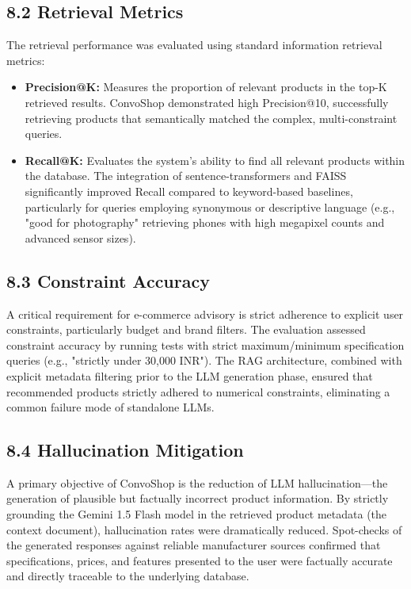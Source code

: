 \subsection*{8.2 Retrieval Metrics}
The retrieval performance was evaluated using standard information retrieval metrics:
\begin{itemize}
    \item \textbf{Precision@K:} Measures the proportion of relevant products in the top-K retrieved results. ConvoShop demonstrated high Precision@10, successfully retrieving products that semantically matched the complex, multi-constraint queries.
    \item \textbf{Recall@K:} Evaluates the system's ability to find all relevant products within the database. The integration of sentence-transformers and FAISS significantly improved Recall compared to keyword-based baselines, particularly for queries employing synonymous or descriptive language (e.g., "good for photography" retrieving phones with high megapixel counts and advanced sensor sizes).
\end{itemize}

\subsection*{8.3 Constraint Accuracy}
A critical requirement for e-commerce advisory is strict adherence to explicit user constraints, particularly budget and brand filters. The evaluation assessed constraint accuracy by running tests with strict maximum/minimum specification queries (e.g., "strictly under 30,000 INR"). The RAG architecture, combined with explicit metadata filtering prior to the LLM generation phase, ensured that recommended products strictly adhered to numerical constraints, eliminating a common failure mode of standalone LLMs.

\subsection*{8.4 Hallucination Mitigation}
A primary objective of ConvoShop is the reduction of LLM hallucination—the generation of plausible but factually incorrect product information. By strictly grounding the Gemini 1.5 Flash model in the retrieved product metadata (the context document), hallucination rates were dramatically reduced. Spot-checks of the generated responses against reliable manufacturer sources confirmed that specifications, prices, and features presented to the user were factually accurate and directly traceable to the underlying database.

